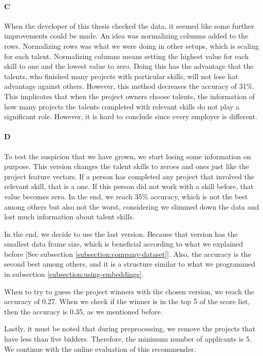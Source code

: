 \paragraph{C} When the developer of this thesis checked the data, it seemed like some further improvements could be made. An idea was normalizing columns added to the rows. Normalizing rows was what we were doing in other setups, which is scaling for each talent. Normalizing columns means setting the highest value for each skill to one and the lowest value to zero. Doing this has the advantage that the talents, who finished many projects with particular skills, will not lose hat advantage against others. However, this method decreases the accuracy of 31\%. This implicates that when the project owners choose talents, the information of how many projects the talents completed with relevant skills do not play a significant role. However, it is hard to conclude since every employer is different.

\paragraph{D} To test the suspicion that we have grown, we start losing some information on purpose. This version changes the talent skills to zeroes and ones just like the project feature vectors. If a person has completed any project that involved the relevant skill, that is a one. If this person did not work with a skill before, that value becomes zero. In the end, we reach 35\% accuracy, which is not the best among others but also not the worst, considering we slimmed down the data and lost much information about talent skills.

In the end, we decide to use the last version. Because that version has the smallest data frame size, which is beneficial according to what we explained before [See subsection \ref{subsection:company-dataset}]. Also, the accuracy is the second best among others, and it is a structure similar to what we programmed in subsection \ref{subsection:using-embeddings}.

When to try to guess the project winners with the chosen version, we reach the accuracy of 0.27. When we check if the winner is in the top 5 of the score list, then the accuracy is 0.35, as we mentioned before. 

Lastly, it must be noted that during preprocessing, we remove the projects that have less than five bidders. Therefore, the minimum number of applicants is 5. We continue with the online evaluation of this recommender.

